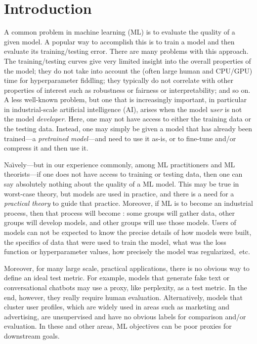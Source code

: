 \section{Introduction}
\label{sxn:intro}

A common problem in machine learning (ML) 
is to evaluate the quality of a given model.
A popular way to accomplish this
is to train a model and then evaluate its training/testing error.
There are many problems with this approach.
The training/testing curves give very limited insight into the overall properties of the model; 
they do not take into account the (often large human and CPU/GPU) time for hyperparameter fiddling;
they typically do not correlate with other properties of interest such as robustness or fairness or interpretability; 
and so on.
A less well-known problem, but one that is increasingly important, in particular in industrial-scale artificial intelligence (AI), arises when the model \emph{user} is not the model \emph{developer}.
Here, one may not have access to either the training data or the testing data.
Instead, one may simply be given a model that has already been trained---a \emph{pretrained model}---and need to use it as-is, or to fine-tune and/or compress it and then use it.

Na\"{\i}vely---but in our experience commonly, among ML practitioners and ML theorists---if one does not have access to training or testing data, then one can say absolutely nothing about the quality of a ML model.
This may be true in worst-case theory, but models are used in practice, and there is a need for a \emph{practical theory} to guide that practice.
Moreover, if ML is to become an industrial process, then that process will become : some groups will gather data, other groups will develop models, and other groups will use those models.
Users of models can not be expected to know the precise details of how models were built, the specifics of data that were used to train the model, what was the loss function or hyperparameter values, how precisely the model was regularized,~etc.

Moreover, for many large scale, practical applications, there is no obvious way to define an ideal test metric. 
For example, models that generate fake text or conversational chatbots may use a proxy, like perplexity, as a test metric.
In the end, however, they really require human evaluation. 
Alternatively, models that cluster user profiles, which are widely used in areas such as marketing and advertising, are unsupervised and have no obvious labels for comparison and/or evaluation.
In these and other areas, ML objectives can be poor proxies for downstream goals.

